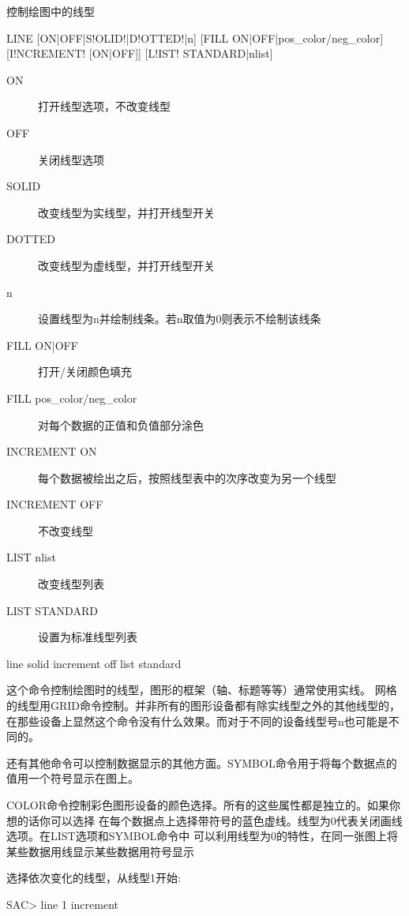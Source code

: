 \label{cmd:line}

控制绘图中的线型

\begin{SACSTX}
LINE [ON|OFF|S!OLID!|D!OTTED!|n] [FILL ON|OFF|pos\_color/neg\_color]
    [I!NCREMENT! [ON|OFF]] [L!IST! STANDARD|nlist]
\end{SACSTX}

\begin{description}
\item [ON] 打开线型选项，不改变线型
\item [OFF] 关闭线型选项
\item [SOLID] 改变线型为实线型，并打开线型开关
\item [DOTTED] 改变线型为虚线型，并打开线型开关
\item [n] 设置线型为n并绘制线条。若n取值为0则表示不绘制该线条
\item [FILL ON|OFF] 打开/关闭颜色填充
\item [FILL pos\_color/neg\_color] 对每个数据的正值和负值部分涂色
\item [INCREMENT ON] 每个数据被绘出之后，按照线型表中的次序改变为另一个线型
\item [INCREMENT OFF] 不改变线型
\item [LIST nlist] 改变线型列表
\item [LIST STANDARD] 设置为标准线型列表
\end{description}

\begin{SACDFT}
line solid increment off list standard
\end{SACDFT}

这个命令控制绘图时的线型，图形的框架（轴、标题等等）通常使用实线。
网格的线型用GRID命令控制。并非所有的图形设备都有除实线型之外的其他线型的，
在那些设备上显然这个命令没有什么效果。而对于不同的设备线型号n也可能是不同的。

还有其他命令可以控制数据显示的其他方面。SYMBOL命令用于将每个数据点的值用一个符号显示在图上。

COLOR命令控制彩色图形设备的颜色选择。所有的这些属性都是独立的。如果你想的话你可以选择
在每个数据点上选择带符号的蓝色虚线。线型为0代表关闭画线选项。在LIST选项和SYMBOL命令中
可以利用线型为0的特性，在同一张图上将某些数据用线显示某些数据用符号显示

选择依次变化的线型，从线型1开始:
\begin{SACCode}
SAC> line 1 increment
\end{SACCode}

